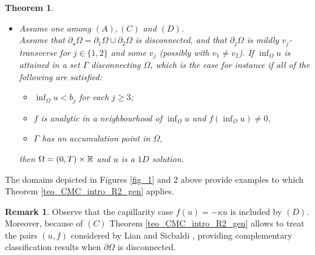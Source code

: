 \documentclass[10 pt,a4paper]{article}
\newtheorem{theorem}[definition]{Theorem}
\theoremstyle{definition}
\newtheorem{remark}[definition]{Remark}
\begin{document}
\begin{theorem}
\begin{itemize}
		\item[(iv)] Assume one among $(A),(C)$ and $(D)$.\\
		Assume that $\partial_\star \Omega = \partial_1\Omega \cup \partial_2\Omega$ is disconnected, and that $\partial_j \Omega$ is mildly $v_j$-transverse for $j \in \{1,2\}$ and some $v_j$ (possibly with $v_1 \neq v_2$). If $\inf_\Omega u$ is attained in a set $\Gamma$ disconnecting $\Omega$, which is the case for instance if all of the following are satisfied: 
		\begin{itemize}
			\item $\inf_\Omega u < b_j$ for each $j \ge 3$;
			\item $f$ is analytic in a neighbourhood of $\inf_\Omega u$ and $f(\inf_\Omega u) \neq 0$, 
			\item $\Gamma$ has an accumulation point in $\overline\Omega$,
		\end{itemize}	
		then $\Omega=(0,T) \times \mathbb R$ and $u$ is a $1D$ solution.
	\end{itemize}
\end{theorem}

The domains depicted in Figures \ref{fig_1} and 2 above provide examples to which Theorem \ref{teo_CMC_intro_R2_gen} applies.

\begin{remark}
	Observe that the capillarity case $f(u) = - \kappa u$ is included by $(D)$. Moreover, because of $(C)$ Theorem \ref{teo_CMC_intro_R2_gen} allows to treat the pairs $(u,f)$ considered by Lian and Sicbaldi \cite{lian_sicbaldi}, providing complementary classification results when $\partial \Omega$ is disconnected.
\end{remark}
\end{document}
